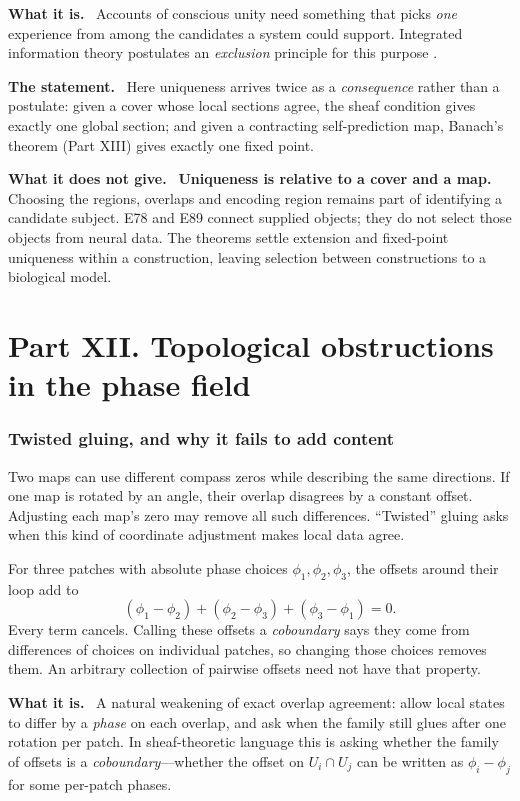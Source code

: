\documentclass[11pt]{article}
\newcommand{\what}{\par\smallskip\noindent\textbf{What it is.}\ }
\newcommand{\statement}{\par\smallskip\noindent\textbf{The statement.}\ }
\newcommand{\scope}{\par\smallskip\noindent\textbf{What it does not give.}\ }
\begin{document}
\what
Accounts of conscious unity need something that picks \emph{one} experience
from among the candidates a system could support. Integrated information theory
postulates an \emph{exclusion} principle for this purpose \citep{tononi2016}.

\statement
Here uniqueness arrives twice as a \emph{consequence} rather than a postulate:
given a cover whose local sections agree, the sheaf condition gives exactly one
global section; and given a contracting self-prediction map, Banach's theorem
(Part XIII) gives exactly one fixed point.

\scope
\textbf{Uniqueness is relative to a cover and a map.} Choosing the regions,
overlaps and encoding region remains part of identifying a candidate subject.
E78 and E89 connect supplied objects; they do not select those objects from
neural data. The theorems settle extension and fixed-point uniqueness within a
construction, leaving selection between constructions to a biological model.

\part*{Part XII. Topological obstructions in the phase field}
\section{Twisted gluing, and why it fails to add content}

Two maps can use different compass zeros while describing the same directions.
If one map is rotated by an angle, their overlap disagrees by a constant
offset. Adjusting each map's zero may remove all such differences. ``Twisted''
gluing asks when this kind of coordinate adjustment makes local data agree.

For three patches with absolute phase choices $\phi_1,\phi_2,\phi_3$, the
offsets around their loop add to
\[
 (\phi_1-\phi_2)+(\phi_2-\phi_3)+(\phi_3-\phi_1)=0.
\]
Every term cancels. Calling these offsets a \emph{coboundary} says they come
from differences of choices on individual patches, so changing those choices
removes them. An arbitrary collection of pairwise offsets need not have that
property.

\what
A natural weakening of exact overlap agreement: allow local states to differ by
a \emph{phase} on each overlap, and ask when the family still glues after one
rotation per patch. In sheaf-theoretic language this is asking whether the
family of offsets is a \emph{coboundary}---whether the offset on
$U_i\cap U_j$ can be written as $\phi_i-\phi_j$ for some per-patch phases.
\end{document}
